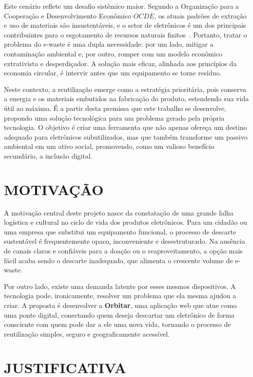 \documentclass[
	12pt,				%
	openright,			%
	oneside,			%
	a4paper,			%
	english,			%
	brazil				%
	]{abntex2}
\theoremstyle{definition}
\begin{document}
Este cenário reflete um desafio sistêmico maior. Segundo a Organização para a Cooperação e Desenvolvimento Econômico \(OCDE\), os atuais padrões de extração e uso de materiais são insustentáveis, e o setor de eletrônicos é um dos principais contribuintes para o esgotamento de recursos naturais finitos~\cite{oecd2019}. Portanto, tratar o problema do e-waste é uma dupla necessidade: por um lado, mitigar a contaminação ambiental e, por outro, romper com um modelo econômico extrativista e desperdiçador. A solução mais eficaz, alinhada aos princípios da economia circular, é intervir antes que um equipamento se torne resíduo.

Neste contexto, a reutilização emerge como a estratégia prioritária, pois conserva a energia e os materiais embutidos na fabricação do produto, estendendo sua vida útil ao máximo. É a partir desta premissa que este trabalho se desenvolve, propondo uma solução tecnológica para um problema gerado pela própria tecnologia. O objetivo é criar uma ferramenta que não apenas ofereça um destino adequado para eletrônicos subutilizados, mas que também transforme um passivo ambiental em um ativo social, promovendo, como um valioso benefício secundário, a inclusão digital.

\section[MOTIVAÇÃO]{MOTIVAÇÃO}

A motivação central deste projeto nasce da constatação de uma grande falha logística e cultural no ciclo de vida dos produtos eletrônicos. Para um cidadão ou uma empresa que substitui um equipamento funcional, o processo de descarte sustentável é frequentemente opaco, inconveniente e desestruturado. Na ausência de canais claros e confiáveis para a doação ou o reaproveitamento, a opção mais fácil acaba sendo o descarte inadequado, que alimenta o crescente volume de e-waste.

Por outro lado, existe uma demanda latente por esses mesmos dispositivos. A tecnologia pode, ironicamente, resolver um problema que ela mesma ajudou a criar. A proposta é desenvolver a \textbf{Orbitar}, uma aplicação web que atue como uma ponte digital, conectando quem deseja descartar um eletrônico de forma consciente com quem pode dar a ele uma nova vida, tornando o processo de reutilização simples, seguro e geograficamente acessível.

\section[JUSTIFICATIVA]{JUSTIFICATIVA}
\end{document}

